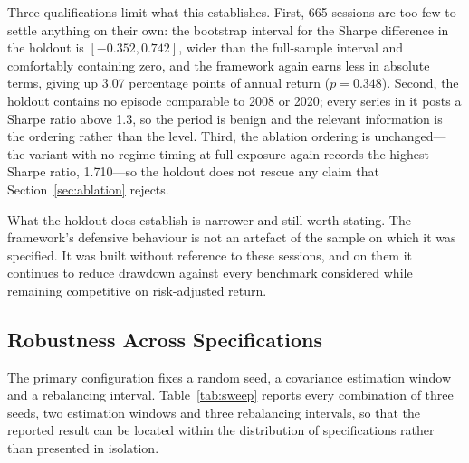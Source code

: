 Three qualifications limit what this establishes. First, 665 sessions are too few to
settle anything on their own: the bootstrap interval for the Sharpe difference in the
holdout is $[-0.352, 0.742]$, wider than the full-sample interval and comfortably
containing zero, and the framework again earns less in absolute terms, giving up 3.07
percentage points of annual return ($p = 0.348$). Second, the holdout contains no
episode comparable to 2008 or 2020; every series in it posts a Sharpe ratio above 1.3,
so the period is benign and the relevant information is the ordering rather than the
level. Third, the ablation ordering is unchanged---the variant with no regime timing at
full exposure again records the highest Sharpe ratio, 1.710---so the holdout does not
rescue any claim that Section~\ref{sec:ablation} rejects.

What the holdout does establish is narrower and still worth stating. The framework's
defensive behaviour is not an artefact of the sample on which it was specified. It was
built without reference to these sessions, and on them it continues to reduce drawdown
against every benchmark considered while remaining competitive on risk-adjusted return.

\subsection{Robustness Across Specifications}
\label{sec:robust}

The primary configuration fixes a random seed, a covariance estimation window and a
rebalancing interval. Table~\ref{tab:sweep} reports every combination of three seeds, two estimation
windows and three rebalancing intervals, so that the reported result can be located
within the distribution of specifications rather than presented in isolation.

